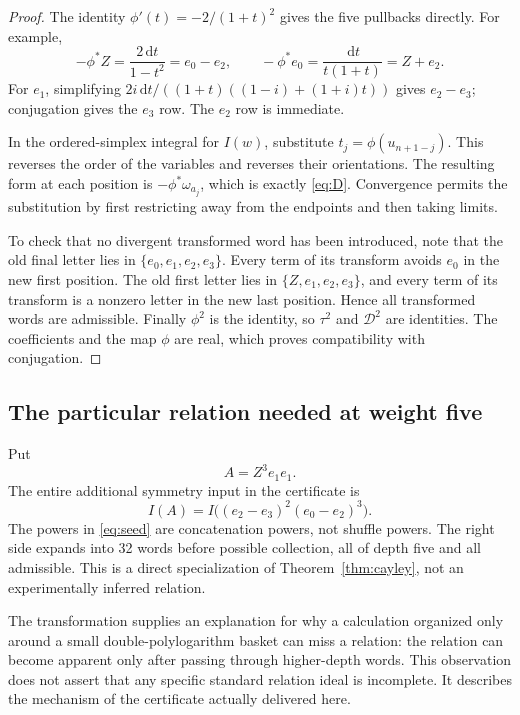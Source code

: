 \documentclass[11pt,letterpaper]{article}
\numberwithin{equation}{section}
\theoremstyle{definition}
\newcommand{\dd}{\,\mathrm d}
\newcommand{\cay}{\mathcal D}
\begin{document}
\begin{proof}
The identity $\phi'(t)=-2/(1+t)^2$ gives the five pullbacks directly.
For example,
\[
 -\phi^*Z=\frac{2\dd t}{1-t^2}=e_0-e_2,
 \qquad -\phi^*e_0=\frac{\dd t}{t(1+t)}=Z+e_2.
\]
For $e_1$, simplifying
$2i\dd t/((1+t)((1-i)+(1+i)t))$ gives $e_2-e_3$;
conjugation gives the $e_3$ row. The $e_2$ row is immediate.

In the ordered-simplex integral for $I(w)$, substitute
$t_j=\phi(u_{n+1-j})$. This reverses the order of the variables and
reverses their orientations. The resulting form at each position is
$-\phi^*\omega_{a_j}$, which is exactly \eqref{eq:D}. Convergence permits
the substitution by first restricting away from the endpoints and
then taking limits.

To check that no divergent transformed word has been introduced,
note that the old final letter lies in $\{e_0,e_1,e_2,e_3\}$.
Every term of its transform avoids $e_0$ in the new first position.
The old first letter lies in $\{Z,e_1,e_2,e_3\}$, and every term of its
transform is a nonzero letter in the new last position. Hence all
transformed words are admissible. Finally $\phi^2$ is the identity,
so $\tau^2$ and $\cay^2$ are identities. The coefficients and the map
$\phi$ are real, which proves compatibility with conjugation.
\end{proof}

\subsection{The particular relation needed at weight five}
Put
\begin{equation}
 A=Z^3e_1e_1.
 \label{eq:A}
\end{equation}
The entire additional symmetry input in the certificate is
\begin{equation}
 I(A)=I\bigl((e_2-e_3)^2(e_0-e_2)^3\bigr).
 \label{eq:seed}
\end{equation}
The powers in \eqref{eq:seed} are concatenation powers, not shuffle
powers. The right side expands into 32 words before possible collection,
all of depth five and all admissible. This is a direct specialization
of Theorem~\ref{thm:cayley}, not an experimentally inferred relation.

The transformation supplies an explanation for why a calculation organized
only around a small double-polylogarithm basket can miss a relation:
the relation can become apparent only after passing through higher-depth
words. This observation does not assert that any specific standard
relation ideal is incomplete. It describes the mechanism of the
certificate actually delivered here.
\end{document}
